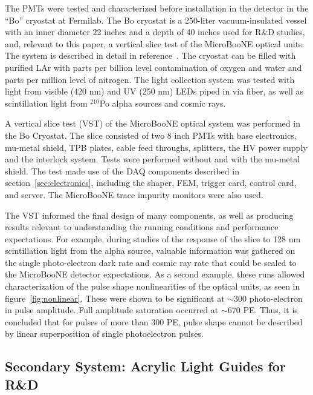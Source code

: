 The PMTs were tested and characterized before installation in the detector in the ``Bo'' cryostat at Fermilab.  The Bo cryostat is a 250-liter vacuum-insulated vessel with an inner diameter 22 inches and a depth of 40 inches used for R\&D studies, and, relevant to this paper, a vertical slice test of the MicroBooNE optical units.  The system is described in detail in reference~\cite{Jones:2015bya}.  The cryostat can be filled with purified LAr with parts per billion level contamination of oxygen and water and parts per million level of nitrogen.  The light collection system was tested with light from visible (420 nm) and UV (250 nm) LEDs piped in via fiber, as well as scintillation light from $^{210}$Po alpha sources and cosmic rays.

A vertical slice test (VST) of the MicroBooNE optical system was performed in the Bo Cryostat.  The slice consisted of two 8 inch PMTs with base electronics, mu-metal shield, TPB plates,  cable feed throughs, splitters, the HV power supply and the interlock system.   Tests were performed without and with the mu-metal shield.   The test made use of the DAQ components described in section~\ref{sec:electronics}, including the shaper, FEM, trigger card, control card, and server.  The MicroBooNE trace impurity monitors were also used.

The VST informed the final design of many components, as well as producing results relevant to understanding the running conditions and performance expectations.   For example, during studies of the response of the slice to 128 nm scintillation light from the alpha source, 
valuable information was gathered on the single photo-electron dark rate and cosmic ray rate that could be scaled to the MicroBooNE detector expectations.    As a second example, these runs allowed characterization of the pulse shape nonlinearities of the optical units, as seen in figure~\ref{fig:nonlinear}.  These were shown to be significant at $\sim$300 photo-electron in pulse amplitude.  Full amplitude saturation occurred at $\sim$670 PE. Thus, it is concluded that for pulses of more than 300 PE, pulse shape cannot be described by linear superposition of single photoelectron pulses. 


\subsection{Secondary System: Acrylic Light Guides for R\&D}


